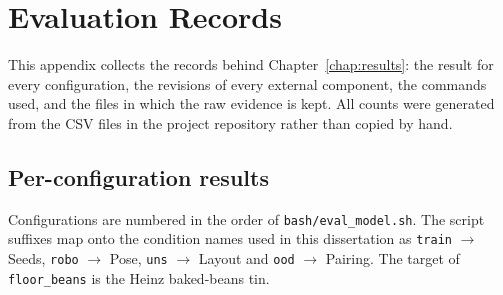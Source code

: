 \chapter{Evaluation Records}
\label{app:details}
\begingroup\justifying
\setlength{\parindent}{2em}\setlength{\parskip}{0.5\baselineskip}

This appendix collects the records behind Chapter~\ref{chap:results}: the result for every configuration, the revisions of every external component, the commands used, and the files in which the raw evidence is kept. All counts were generated from the CSV files in the project repository rather than copied by hand.

\section{Per-configuration results}

Configurations are numbered in the order of \texttt{bash/eval\_model.sh}. The script suffixes map onto the condition names used in this dissertation as \texttt{train} $\to$ Seeds, \texttt{robo} $\to$ Pose, \texttt{uns} $\to$ Layout and \texttt{ood} $\to$ Pairing. The target of \texttt{floor\_beans} is the Heinz baked-beans tin.

